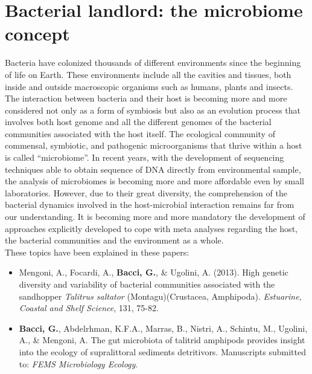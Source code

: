 \logvartrue
\chapter{Bacterial landlord: the microbiome concept}
Bacteria have colonized thousands of different environments since the beginning of life on Earth. These environments include all the cavities and tissues, both inside and outside macroscopic organisms such as humans, plants and insects. The interaction between bacteria and their host is becoming more and more considered not only as a form of symbiosis but also as an evolution process that involves both host genome and all the different genomes of the bacterial communities associated with the host itself. The ecological community of commensal, symbiotic, and pathogenic microorganisms that thrive within a host is called ``microbiome''. In recent years, with the development of sequencing techniques able to obtain sequence of DNA directly from environmental sample, the analysis of microbiomes is becoming more and more affordable even by small laboratories. However, due to their great diversity, the comprehension of the bacterial dynamics involved in the host-microbial interaction remains far from our understanding. It is becoming more and more mandatory the development of approaches explicitly developed to cope with meta analyses regarding the host, the bacterial communities and the environment as a whole.\\
These topics have been explained in these papers:
\vspace{-5mm}
\begin{itemize}
\item Mengoni, A., Focardi, A., \textbf{Bacci, G.}, \& Ugolini, A. (2013). High genetic diversity and variability of bacterial communities associated with the sandhopper \textit{Talitrus saltator} (Montagu)(Crustacea, Amphipoda). \textit{Estuarine, Coastal and Shelf Science}, 131, 75-82.
\item \textbf{Bacci, G.}, Abdelrhman, K.F.A., Marras, B., Nistri, A., Schintu, M., Ugolini, A., \& Mengoni, A. The gut microbiota of talitrid amphipods provides insight into the ecology of supralittoral sediments detritivors. Manuscripts submitted to: \textit{FEMS Microbiology Ecology}.
\end{itemize}

